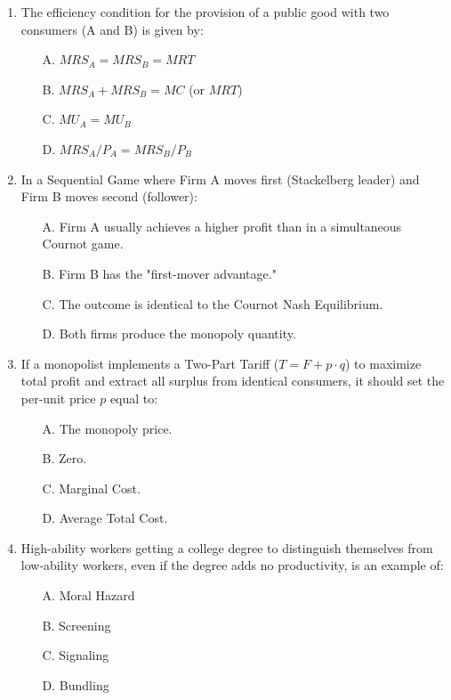 \documentclass[12pt]{article}
\begin{document}
\begin{enumerate}
    \item The efficiency condition for the provision of a public good with two consumers (A and B) is given by:
    \begin{itemize}
        \item[A.] $MRS_A = MRS_B = MRT$
        \item[B.] $MRS_A + MRS_B = MC$ (or $MRT$)
        \item[C.] $MU_A = MU_B$
        \item[D.] $MRS_A / P_A = MRS_B / P_B$
    \end{itemize}

    \item In a Sequential Game where Firm A moves first (Stackelberg leader) and Firm B moves second (follower):
    \begin{itemize}
        \item[A.] Firm A usually achieves a higher profit than in a simultaneous Cournot game.
        \item[B.] Firm B has the "first-mover advantage."
        \item[C.] The outcome is identical to the Cournot Nash Equilibrium.
        \item[D.] Both firms produce the monopoly quantity.
    \end{itemize}

    \item If a monopolist implements a Two-Part Tariff ($T = F + p \cdot q$) to maximize total profit and extract all surplus from identical consumers, it should set the per-unit price $p$ equal to:
    \begin{itemize}
        \item[A.] The monopoly price.
        \item[B.] Zero.
        \item[C.] Marginal Cost.
        \item[D.] Average Total Cost.
    \end{itemize}

    \item High-ability workers getting a college degree to distinguish themselves from low-ability workers, even if the degree adds no productivity, is an example of:
    \begin{itemize}
        \item[A.] Moral Hazard
        \item[B.] Screening
        \item[C.] Signaling
        \item[D.] Bundling
    \end{itemize}


\end{enumerate}
\end{document}

